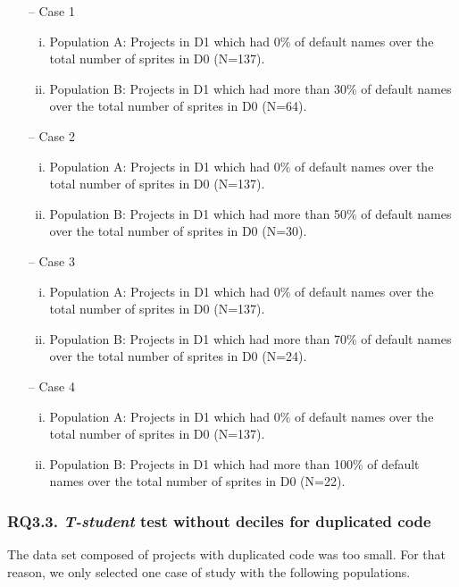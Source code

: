 \begin{itemize}
    \item[--] Case 1
    \begin{enumerate}[(i)]
        \item Population A: Projects in D1 which had 0\% of default names over the total number of sprites in D0 (N=137).
        \item Population B: Projects in D1 which had more than 30\% of default names over the total number of sprites  in D0 (N=64).
    \end{enumerate}
    \item[--] Case 2
    \begin{enumerate}[(i)]
        \item Population A: Projects in D1 which had 0\% of default names over the total number of sprites in D0 (N=137).
        \item Population B: Projects in D1 which had more than 50\% of default names over the total number of sprites  in D0 (N=30).
    \end{enumerate}
    \item[--] Case 3
    \begin{enumerate}[(i)]
        \item Population A: Projects in D1 which had 0\% of default names over the total number of sprites in D0 (N=137).
        \item Population B: Projects in D1 which had more than 70\% of default names over the total number of sprites  in D0 (N=24).
    \end{enumerate}
    \item[--] Case 4
    \begin{enumerate}[(i)]
        \item Population A: Projects in D1 which had 0\% of default names over the total number of sprites in D0 (N=137).
        \item Population B: Projects in D1 which had more than 100\% of default names over the total number of sprites in D0 (N=22).
    \end{enumerate}
\end{itemize}


\subsubsection{RQ3.3. \textit{T-student} test without deciles for duplicated code}
\label{subsubsec:RQ3_3_statistical}

The data set composed of projects with duplicated code was too small. For that reason, we only selected one case of study with the following populations. 

